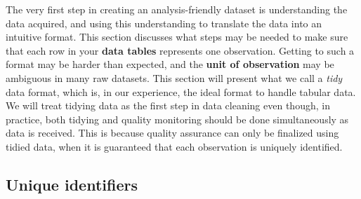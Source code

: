 The very first step in creating an analysis-friendly dataset
is understanding the data acquired,
and using this understanding to translate the data into an intuitive format.
This section discusses what steps may be needed to make sure that each row
in your \textbf{data tables}
represents one observation.
Getting to such a format may be harder than expected,
and the \textbf{unit of observation}
 may be ambiguous in many raw datasets.
This section will present what we call a \textit{tidy} data format,
which is, in our experience, the ideal format to handle tabular data.
We will treat tidying data as the first step in data cleaning even though, in practice, 
both tidying and quality monitoring should be done simultaneously as data is received.
This is because quality assurance can only be finalized using tidied data,
when it is guaranteed that each observation is uniquely identified.

\subsection{Unique identifiers}

